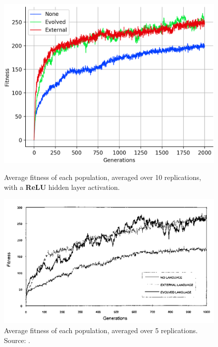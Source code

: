 \documentclass[12pt,a4paper]{report}
\begin{document}
\begin{figure}[t]
   \centering
   \begin{minipage}{0.49\textwidth}
          \centering
          \captionsetup{width=.9\linewidth}
          \includegraphics[width=1.\linewidth]{results/average-relu.png}
          \caption{Average fitness of each population, averaged over 10 replications, with a {\bf ReLU} hidden layer activation.}
          \label{fig:average-relu}
   \end{minipage}
   \begin{minipage}{0.49\textwidth}
          \centering
          \captionsetup{width=.9\linewidth}
          \includegraphics[width=1.\linewidth]{figs/fitness.png}
          \caption{Average fitness of each population, averaged over 5 replications. Source: \citet{Cangelosi1998}.}
          \label{fig:cangelosi-results}
   \end{minipage}
\end{figure}
\end{document}
